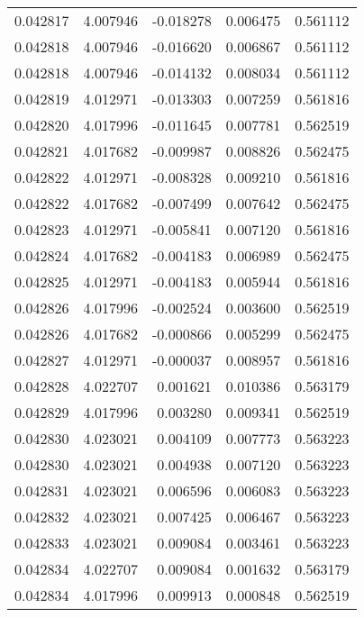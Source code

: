 \begin{tabular}{lrrrr}
0.042817    &  4.007946 & -0.018278 &  0.006475 &             0.561112 \\
0.042818    &  4.007946 & -0.016620 &  0.006867 &             0.561112 \\
0.042818    &  4.007946 & -0.014132 &  0.008034 &             0.561112 \\
0.042819    &  4.012971 & -0.013303 &  0.007259 &             0.561816 \\
0.042820    &  4.017996 & -0.011645 &  0.007781 &             0.562519 \\
0.042821    &  4.017682 & -0.009987 &  0.008826 &             0.562475 \\
0.042822    &  4.012971 & -0.008328 &  0.009210 &             0.561816 \\
0.042822    &  4.017682 & -0.007499 &  0.007642 &             0.562475 \\
0.042823    &  4.012971 & -0.005841 &  0.007120 &             0.561816 \\
0.042824    &  4.017682 & -0.004183 &  0.006989 &             0.562475 \\
0.042825    &  4.012971 & -0.004183 &  0.005944 &             0.561816 \\
0.042826    &  4.017996 & -0.002524 &  0.003600 &             0.562519 \\
0.042826    &  4.017682 & -0.000866 &  0.005299 &             0.562475 \\
0.042827    &  4.012971 & -0.000037 &  0.008957 &             0.561816 \\
0.042828    &  4.022707 &  0.001621 &  0.010386 &             0.563179 \\
0.042829    &  4.017996 &  0.003280 &  0.009341 &             0.562519 \\
0.042830    &  4.023021 &  0.004109 &  0.007773 &             0.563223 \\
0.042830    &  4.023021 &  0.004938 &  0.007120 &             0.563223 \\
0.042831    &  4.023021 &  0.006596 &  0.006083 &             0.563223 \\
0.042832    &  4.023021 &  0.007425 &  0.006467 &             0.563223 \\
0.042833    &  4.023021 &  0.009084 &  0.003461 &             0.563223 \\
0.042834    &  4.022707 &  0.009084 &  0.001632 &             0.563179 \\
0.042834    &  4.017996 &  0.009913 &  0.000848 &             0.562519 \\

\end{tabular}
